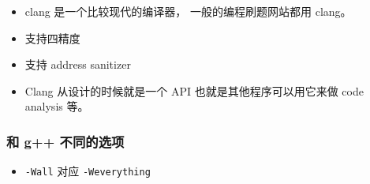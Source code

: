 
\begin{issues}
\issueDraft
\end{issues}

\begin{itemize}
\item clang 是一个比较现代的编译器， 一般的编程刷题网站都用 clang。
\item 支持四精度
\item 支持 address sanitizer
\item Clang 从设计的时候就是一个 API 也就是其他程序可以用它来做 code analysis 等。
\end{itemize}

\subsubsection{和 g++ 不同的选项}
\begin{itemize}
\item \verb`-Wall` 对应 \verb`-Weverything`
\end{itemize}

